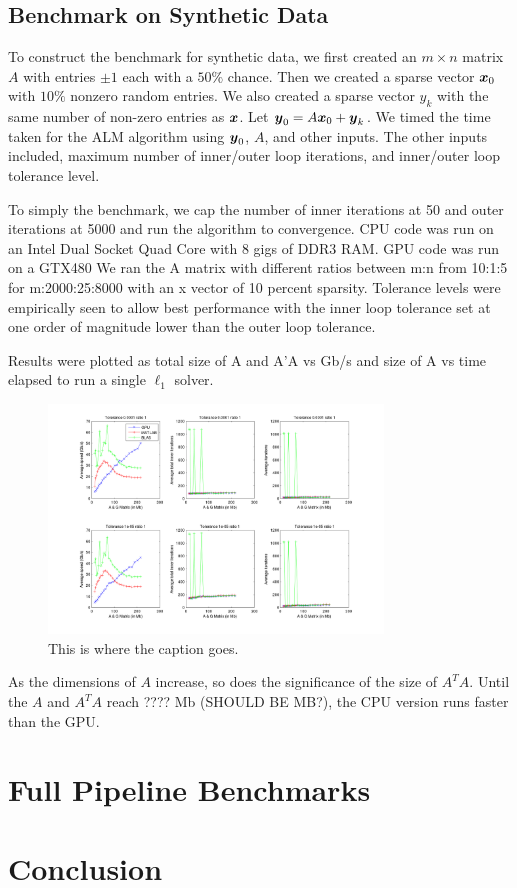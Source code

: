 \documentclass[10pt,twocolumn,letterpaper]{article}
\begin{document}
\subsection{Benchmark on Synthetic Data}

To construct the benchmark for synthetic data, we first created an $m \times n$
matrix $A$ with entries $\pm 1$ each with a $50\%$ chance.  Then we created a
sparse vector ${\boldsymbol{x}}_0$ with $10\%$ nonzero random entries.  We also created a
sparse vector $y_k$ with the same number of non-zero entries as ${\boldsymbol{x}}$.  Let
$\boldsymbol{y}_0 = A {\boldsymbol{x}}_0 + \boldsymbol{y}_k$.  We timed the time taken for the ALM algorithm using
$\boldsymbol{y}_0$, $A$, and other inputs.  The other inputs included, maximum number of
inner/outer loop iterations, and inner/outer loop tolerance level.

To simply the benchmark, we cap the number of inner iterations at 50 and outer iterations
at 5000 and run the algorithm to convergence.  CPU code was run on an Intel
Dual Socket Quad Core with 8 gigs of DDR3 RAM.  GPU code was run on a GTX480 We
ran the A matrix with different ratios between m:n from 10:1:5 for m:2000:25:8000 with an x vector of 10 percent sparsity.  Tolerance levels were
empirically seen to allow best performance with the inner loop tolerance set at
one order of magnitude lower than the outer loop tolerance.

Results were plotted as total size of A and A'A vs Gb/s and size of A vs time
elapsed to run a single $\ell_1$ solver.

\begin{figure}
\centering
\includegraphics[width=3.5in]{figures/PALM_benchmark_ratio_1}
\caption{This is where the caption goes.}
\label{fig:uniqueidentifierforthisimage}
\end{figure}

As the dimensions of $A$ increase, so does the significance of the size of
$A^TA$.  Until the $A$ and $A^TA$ reach ???? Mb (SHOULD BE MB?), the CPU version runs faster
than the GPU.  

\section{Full Pipeline Benchmarks}

\section{Conclusion}

{\small


}
\end{document}
